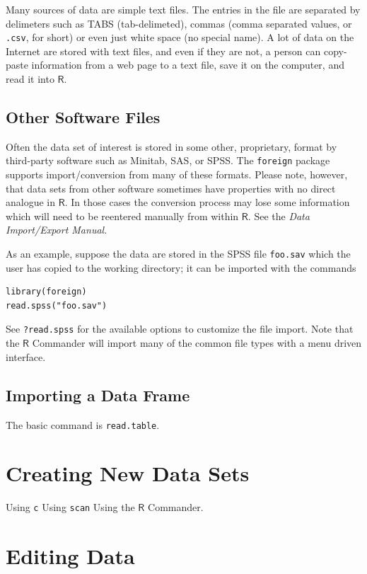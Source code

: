 \documentclass[captions=tableheading]{scrbook}
\begin{document}
\begin{example}
Many sources of data are simple text files. The entries in the file are separated by delimeters such as TABS (tab-delimeted), commas (comma separated values, or \texttt{.csv}, for short) or even just white space (no special name). A lot of data on the Internet are stored with text files, and even if they are not, a person can copy-paste information from a web page to a text file, save it on the computer, and read it into \(\mathsf{R}\). 
\subsection{Other Software Files}
\label{sec-20-2-3}

Often the data set of interest is stored in some other, proprietary, format by third-party software such as Minitab, SAS, or SPSS. The \texttt{foreign} package supports import/conversion from many of these formats. Please note, however, that data sets from other software sometimes have properties with no direct analogue in \(\mathsf{R}\). In those cases the conversion process may lose some information which will need to be reentered manually from within \(\mathsf{R}\). See the \emph{Data Import/Export Manual}.

As an example, suppose the data are stored in the SPSS file \texttt{foo.sav} which the user has copied to the working directory; it can be imported with the commands


\lstset{language=R}
\begin{lstlisting}
library(foreign)
read.spss("foo.sav")
\end{lstlisting}

See \texttt{?read.spss} for the available options to customize the file import. Note that the \(\mathsf{R}\) Commander will import many of the common file types with a menu driven interface.
\subsection{Importing a Data Frame}
\label{sec-20-2-4}


The basic command is \texttt{read.table}.
\section{Creating New Data Sets}
\label{sec-20-3}
\label{sec-Creating-New-Data}


Using \texttt{c}
Using \texttt{scan}
Using the \(\mathsf{R}\) Commander.
\section{Editing Data}
\label{sec-20-4}
\label{sec-Editing-Data-Sets}

\end{example}
\end{document}

